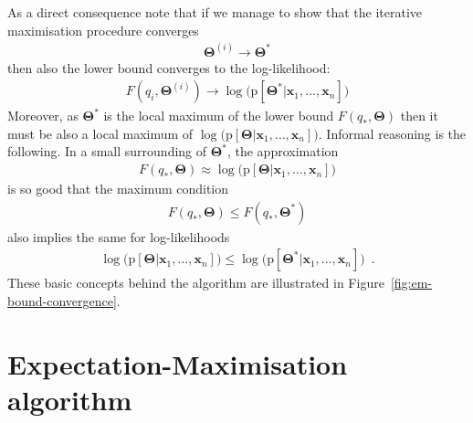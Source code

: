 \documentclass{article}
\renewcommand{\vec}[1]{\boldsymbol{#1}}
\newcommand{\pd}[1]{\mathrm{p}[#1]}
\newcommand{\supi}[1]{^{\scriptscriptstyle(#1)}}
\begin{document}
As a direct consequence note that if we manage to show that the iterative maximisation procedure converges
\begin{align*}
\vec{\Theta}\supi{i} \to \vec{\Theta}^*
\end{align*}
then also the lower bound converges to the log-likelihood:
\begin{align*}
F(q_i,\vec{\Theta}\supi{i}) \to \log\bigl(\pd{\vec{\Theta}^*|\vec{x}_1,\ldots,\vec{x}_n}\bigr)
\end{align*}
Moreover, as $\vec{\Theta}^*$ is the local maximum of the lower bound $F(q_*,\vec{\Theta})$ then it must be also a local    
maximum of $\log\bigl(\pd{\vec{\Theta}|\vec{x}_1,\ldots,\vec{x}_n}\bigr)$.  Informal reasoning is the following. In a small surrounding of $\vec{\Theta}^*$, the approximation 
\begin{align*}
F(q_*,\vec{\Theta}) \approx \log\bigl(\pd{\vec{\Theta}|\vec{x}_1,\ldots,\vec{x}_n}\bigr)
\end{align*}
is so good that the maximum condition
\begin{align*}
F(q_*,\vec{\Theta})\leq F(q_*,\vec{\Theta}^*)  
\end{align*}
also implies the same for log-likelihoods
\begin{align*}
\log\bigl(\pd{\vec{\Theta}|\vec{x}_1,\ldots,\vec{x}_n}\bigr) \leq \log\bigl(\pd{\vec{\Theta}^*|\vec{x}_1,\ldots,\vec{x}_n}\bigr)\enspace.
\end{align*}
These basic concepts behind the algorithm are illustrated in Figure~\ref{fig:em-bound-convergence}. 


\section{Expectation-Maximisation algorithm}
\end{document}
